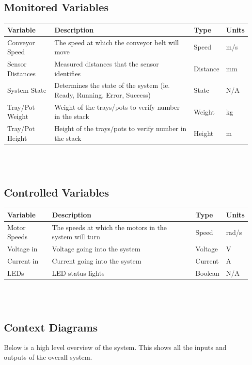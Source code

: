 \documentclass[12pt]{article}
\begin{document}
 \subsection{Monitored Variables}
 \begin{tabular}{ |p{3cm}|p{9cm}|p{2cm}|p{1cm}| }
  \hline
  Variable & Description & Type & Units\\
  \hline
  Conveyor Speed & The speed at which the conveyor belt will move
   & Speed & m/s\\
  \hline
  Sensor Distances & Measured distances that the sensor identifies
   & Distance & mm\\
  \hline
  System State & Determines the state of the system (ie. Ready, Running, Error, Success)
   & State &  N/A\\
  \hline
  Tray/Pot Weight & Weight of the trays/pots to verify number in the stack
   & Weight & kg\\
  \hline
  Tray/Pot Height & Height of the trays/pots to verify number in the stack
   & Height & m\\
  
  \hline
 \end{tabular}\\\\

 \subsection{Controlled Variables}
 \begin{tabular}{ |p{3cm}|p{9cm}|p{2cm}|p{1cm}| }
  \hline
  Variable & Description & Type & Units\\
  \hline
  Motor Speeds & The speeds at which the motors in the system will turn
   & Speed & rad/s\\
  \hline
  Voltage in & Voltage going into the system
   & Voltage & V\\
  \hline
  Current in & Current going into the system
   & Current &  A\\
  \hline
  LEDs & LED status lights
   & Boolean & N/A\\
  
  \hline
 \end{tabular}\\\\

\subsection{Context Diagrams}
Below is a high level overview of the system. This shows all the inputs and outputs
of the overall system.
\end{document}
